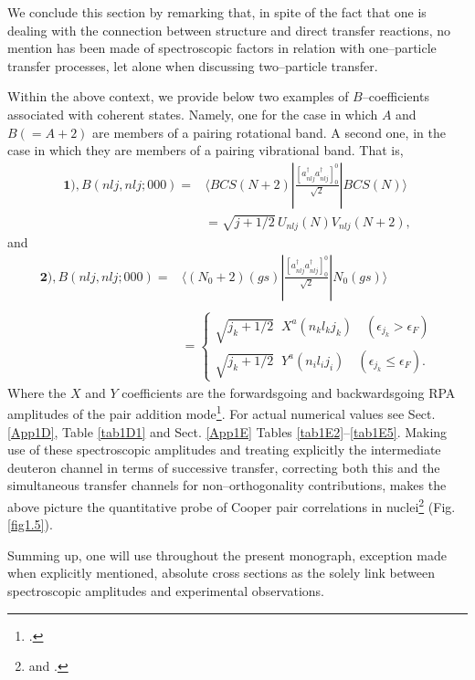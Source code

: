 We conclude this section by remarking that, in spite of the fact that one is dealing with the connection between structure and direct transfer reactions, no mention has been made of spectroscopic factors in relation with one--particle transfer processes, let alone when discussing two--particle transfer. 


Within the above context, we provide below two examples of $B$--coefficients associated with coherent states. Namely, one for the case in which $A$ and $B(=A+2)$ are members of a pairing rotational band. A second one, in the case in which they are members of a pairing vibrational band. That is, 
\begin{equation}\label{eqC21.8}
\begin{split}
\mathbf{1)}, B(nlj,nlj;000)=&\langle BCS(N+2)|\frac{[a^\dagger_{nlj}a^\dagger_{nlj}]^0_0}{\sqrt{2}}|BCS(N)\rangle\\
&=\sqrt{j+1/2}\,U_{nlj}(N)V_{nlj}(N+2),
\end{split}
\end{equation}
and
\begin{equation}
\begin{split}
\mathbf{2)}, B(nlj,nlj;000)=&\langle (N_0+2)(gs)|\frac{[a^\dagger_{nlj}a^\dagger_{nlj}]^0_0}{\sqrt{2}}|N_0(gs)\rangle \\
&\\
&=\left\{\begin{array}{c}
\sqrt{j_k+1/2}\;\;X^a(n_kl_kj_k)\quad (\epsilon_{j_k}>\epsilon_F) \\ 
\sqrt{j_k+1/2}\;\;Y^a(n_il_ij_i)\quad (\epsilon_{j_k}\leq\epsilon_F).
\end{array} \right.
\end{split}
\end{equation}
Where the $X$ and $Y$ coefficients are the forwardsgoing and backwardsgoing RPA amplitudes of the pair addition mode\footnote{\cite{Brink:05}.}.
For actual numerical values see Sect. \ref{App1D}, Table \ref{tab1D1} and Sect. \ref{App1E} Tables \ref{tab1E2}--\ref{tab1E5}. Making use of these spectroscopic amplitudes and treating explicitly the intermediate deuteron channel in terms of successive transfer, correcting both this and the simultaneous transfer channels for non--orthogonality contributions, makes the above picture the quantitative probe of Cooper pair correlations in nuclei\footnote{\cite{Bayman:82} and \cite{Potel:13}.}  (Fig. \ref{fig1.5}).

Summing up, one will use throughout the present monograph, exception made when explicitly mentioned, absolute cross sections as the solely link between spectroscopic amplitudes and experimental observations.

